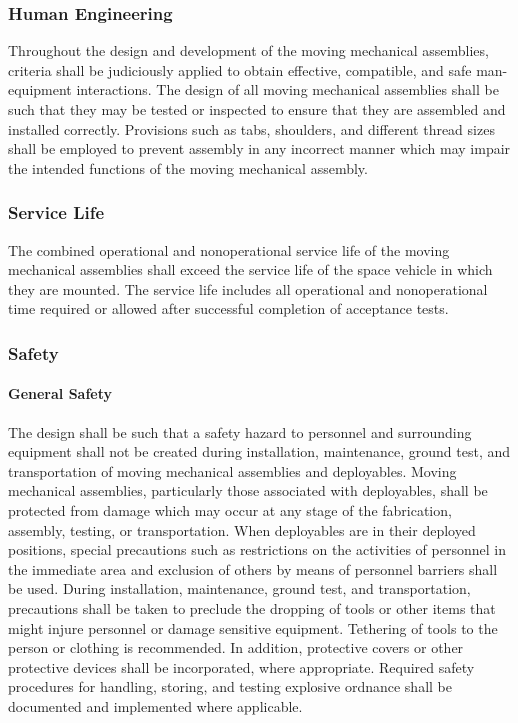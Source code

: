 \documentclass[12pt]{article}
\begin{document}
\subsubsection{Human Engineering} %
Throughout the design and development of the moving mechanical assemblies, criteria shall be judiciously applied to obtain effective, compatible, and safe man-equipment interactions. 
The design of all moving mechanical assemblies shall be such that they may be tested or inspected to ensure that they are assembled and installed correctly.
Provisions such as tabs, shoulders, and different thread sizes shall be employed to prevent assembly in any incorrect manner which may impair the intended functions of the moving mechanical assembly.

\subsubsection{Service Life} %
The combined operational and nonoperational service life of the moving mechanical assemblies shall exceed the service life of the space vehicle in which they are mounted. 
The service life includes all operational and nonoperational time required or allowed after successful completion of acceptance tests.

\subsubsection{Safety} %
\paragraph{General Safety} %
The design shall be such that a safety hazard to personnel and surrounding equipment shall not be created during installation, maintenance, ground test, and transportation of moving mechanical assemblies and deployables.
Moving mechanical assemblies, particularly those associated with deployables, shall be protected from damage which may occur at any stage of the fabrication, assembly, testing, or transportation. 
When deployables are in their deployed positions, special precautions such as restrictions on the activities of personnel in the immediate area and exclusion of others by means of personnel barriers shall be used. 
During installation, maintenance, ground test, and transportation, precautions shall be taken to preclude the dropping of tools or other items that might injure personnel or damage sensitive equipment. 
Tethering of tools to the person or clothing is recommended. 
In addition, protective covers or other protective devices shall be incorporated, where appropriate. 
Required safety procedures for handling, storing, and testing explosive ordnance shall be documented and implemented where applicable.
\end{document}
